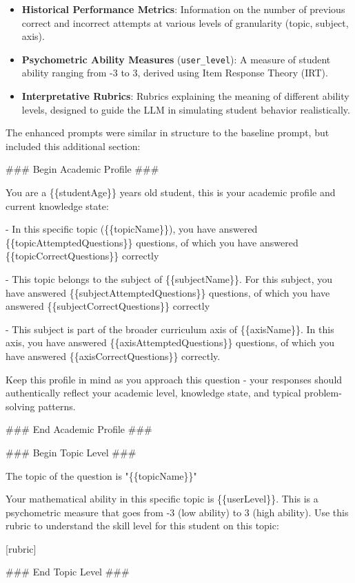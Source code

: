 \documentclass[
    a4paper, %
    10pt, %
    twoside, %
]{LTJournalArticle}
\begin{document}
\begin{itemize}
    \item \textbf{Historical Performance Metrics}: Information on the number of previous correct and incorrect attempts at various levels of granularity (topic, subject, axis).
    \item \textbf{Psychometric Ability Measures} (\texttt{user\_level}): A measure of student ability ranging from -3 to 3, derived using Item Response Theory (IRT).
    \item \textbf{Interpretative Rubrics}: Rubrics explaining the meaning of different ability levels, designed to guide the LLM in simulating student behavior realistically.
\end{itemize}

The enhanced prompts were similar in structure to the baseline prompt, but included this additional section:

\begin{promptbox}
    \#\#\# Begin Academic Profile \#\#\#

    You are a \{\{studentAge\}\} years old student, this is your academic profile and current knowledge state:
    
    - In this specific topic (\{\{topicName\}\}), you have answered \{\{topicAttemptedQuestions\}\} questions, of which you have answered \{\{topicCorrectQuestions\}\} correctly
    
    - This topic belongs to the subject of \{\{subjectName\}\}. For this subject, you have answered \{\{subjectAttemptedQuestions\}\} questions, of which you have answered \{\{subjectCorrectQuestions\}\} correctly
    
    - This subject is part of the broader curriculum axis of \{\{axisName\}\}. In this axis, you have answered \{\{axisAttemptedQuestions\}\} questions, of which you have answered \{\{axisCorrectQuestions\}\} correctly.
    
    Keep this profile in mind as you approach this question - your responses should authentically reflect your academic level, knowledge state, and typical problem-solving patterns.
    
    \#\#\# End Academic Profile \#\#\#

    \vspace{1em}

    \#\#\# Begin Topic Level \#\#\#

    The topic of the question is "\{\{topicName\}\}"

    Your mathematical ability in this specific topic is \{\{userLevel\}\}. This is a psychometric measure that goes from -3 (low ability) to 3 (high ability). Use this rubric to understand the skill level for this student on this topic:

    \vspace{1em}

    [rubric]

    \#\#\# End Topic Level \#\#\#
\end{promptbox}
\end{document}
